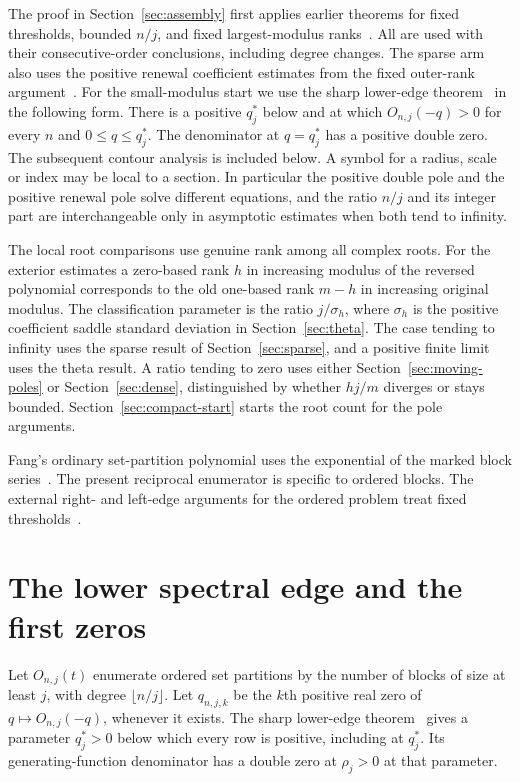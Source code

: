 \documentclass[11pt]{article}
\begin{document}
The proof in Section~\ref{sec:assembly} first applies earlier theorems for fixed thresholds, bounded \(n/j\), and fixed largest-modulus ranks~\cite{fixed,window,outer}. All are used with their consecutive-order conclusions, including degree changes. The sparse arm also uses the positive renewal coefficient estimates from the fixed outer-rank argument~\cite{outer,renewal,comparable}. For the small-modulus start we use the sharp lower-edge theorem~\cite{edge} in the following form. There is a positive \(q_j^*\) below and at which \(O_{n,j}(-q)>0\) for every \(n\) and \(0\le q\le q_j^*\). The denominator at \(q=q_j^*\) has a positive double zero. The subsequent contour analysis is included below. A symbol for a radius, scale or index may be local to a section. In particular the positive double pole and the positive renewal pole solve different equations, and the ratio \(n/j\) and its integer part are interchangeable only in asymptotic estimates when both tend to infinity.

The local root comparisons use genuine rank among all complex roots. For the exterior estimates a zero-based rank \(h\) in increasing modulus of the reversed polynomial corresponds to the old one-based rank \(m-h\) in increasing original modulus. The classification parameter is the ratio \(j/\sigma_h\), where \(\sigma_h\) is the positive coefficient saddle standard deviation in Section~\ref{sec:theta}. The case tending to infinity uses the sparse result of Section~\ref{sec:sparse}, and a positive finite limit uses the theta result. A ratio tending to zero uses either Section~\ref{sec:moving-poles} or Section~\ref{sec:dense}, distinguished by whether \(hj/m\) diverges or stays bounded. Section~\ref{sec:compact-start} starts the root count for the pole arguments.

Fang's ordinary set-partition polynomial uses the exponential of the marked block series~\cite{fang}. The present reciprocal enumerator is specific to ordered blocks. The external right- and left-edge arguments for the ordered problem treat fixed thresholds~\cite{right,left}.

\section{The lower spectral edge and the first zeros}
\label{sec:joint}

Let \(O_{n,j}(t)\) enumerate ordered set partitions by the number of blocks of size at least \(j\), with degree \(\lfloor n/j\rfloor\). Let \(q_{n,j,k}\) be the \(k\)th positive real zero of \(q\mapsto O_{n,j}(-q)\), whenever it exists. The sharp lower-edge theorem~\cite{edge} gives a parameter \(q_j^*>0\) below which every row is positive, including at \(q_j^*\). Its generating-function denominator has a double zero at \(\rho_j>0\) at that parameter.
\end{document}

